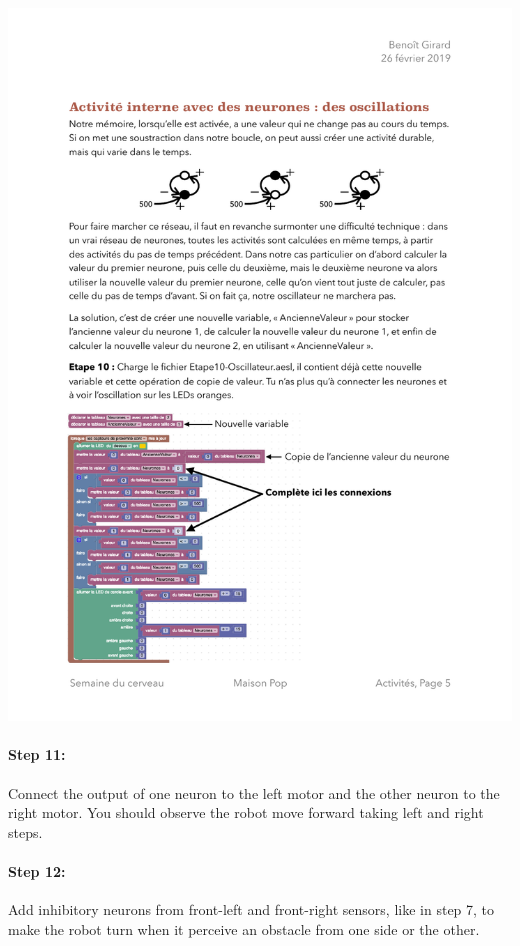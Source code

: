 \documentclass[12pt]{article}
\begin{document}
\begin{center}
\includegraphics[width=\textwidth]{../ProgrammeEtape10.pdf}
\end{center}

\paragraph{Step 11:} Connect the output of one neuron to the left motor and the other neuron to the right motor. You should observe the robot move forward taking left and right steps.

\paragraph{Step 12:} 

Add inhibitory neurons from front-left and front-right sensors, like in step 7, to make the robot turn when it perceive an obstacle from one side or the other.
\end{document}
